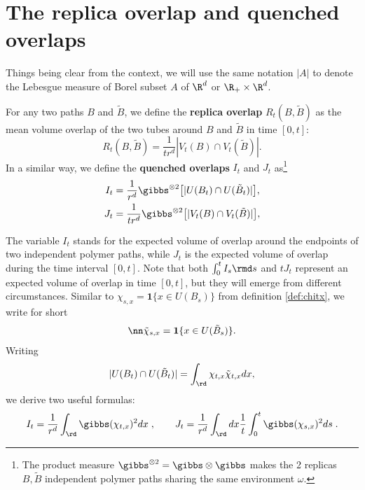 \section{The replica overlap and quenched overlaps}
Things being clear from the context, we will use the same notation $|A|$ to denote the Lebesgue measure of Borel subset $A$ of $\R^d$ or $\R_+ \times \R^d$.
\begin{definition}
For any two paths $B$ and $\tilde{B}$, we define the \textbf{replica overlap} $R_t(B,\tilde{B})$ as the mean volume overlap of the two tubes around $B$ and $\tilde{B}$ in time $[0,t]$:
\begin{equation}\label{eq:ov1}
R_t(B,\tilde{B})=\frac{1}{tr^d} | V_t(B)\cap V_t(\tilde{B})|.
\end{equation}
In a similar way, we define the \textbf{quenched overlaps} $I_t$ and $J_t$ %
as\footnote{The product measure ${\gibbs}^{ \otimes 2} = \gibbs \otimes \gibbs$ makes the 2 replicas $B, \tilde B$ independent polymer paths sharing the same environment $\omega$.}
\begin{align} \label{eq:ov2}
I_t &= \frac {1}{r^{d}} %
{\gibbs}^{ \otimes 2} \big[ |U(B_t) \cap U(\tilde{B}_t)| \big]
,\\ \label{eq:ov3}
J_t &=   \frac {1}{tr^{d}}  %
{\gibbs}^{ \otimes 2} \big[ |V_t(B) \cap V_t(\tilde{B})| \big],
\end{align}
\end{definition}

The  variable $I_t$ stands for the expected volume of overlap around the endpoints of two  independent polymer paths, while $J_t$ is the expected volume of overlap during the time interval $[0,t]$.
Note that both $\int_0^t I_s \rmd s$ and $t J_t$ represent an expected volume of overlap in time $[0,t]$, but they will emerge from different circumstances. 
Similar to  $\chi_{s,x}= {\mathbf 1} \{x \in U(B_s) \}$ from definition \eqref{def:chitx}, we write for short 
\begin{equation}\nn
\tilde \chi_{s,x}= {\mathbf 1} \{x \in U(\tilde B_s) \} .
\end{equation}
Writing 
$$
|U(B_t) \cap U(\tilde{B}_t)|  = \int_{\rd}  \chi_{t,x}\tilde \chi_{t,x} dx,
$$
we derive two useful formulas:
\begin{equation}\label{eq:useful}
I_t=\frac{1}{r^{d}}  \int_{\rd} \gibbs (\chi_{t,x})^2 dx\;,\qquad J_t = \frac{1}{r^{d}} \int_{\rd} dx \frac 1t  \int_0^t \gibbs (\chi_{s,x})^2 ds\;.
\end{equation}

